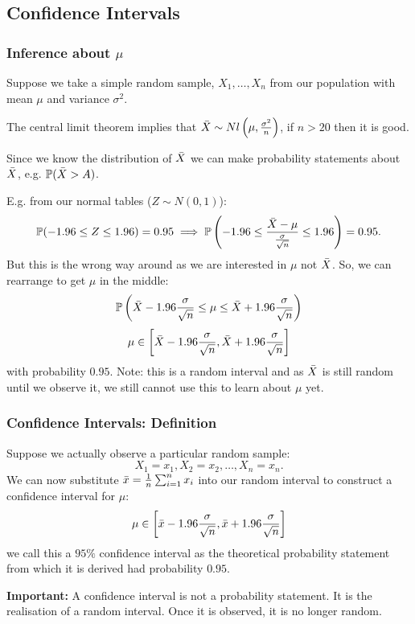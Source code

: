 \documentclass[10pt, a4paper]{article}
\begin{document}
\subsection{Confidence Intervals}
\subsubsection{Inference about \texorpdfstring{$\mu$}{}}

Suppose we take a simple random sample,
$X_1, \dotsc, X_n$ from our population with mean $\mu$ and variance $\sigma ^ 2$.

The central limit theorem implies that $\Bar{X} \sim Nl\left(\mu, \frac{\sigma ^ 2}{n}\right)$,
if $n > 20$ then it is good.

Since we know the distribution of $\Bar{X}$ we can make probability statements about $\Bar{X}$,
e.g. $\P(\Bar{X} > A)$.

E.g.
from our normal tables
($Z \sim N(0, 1)$):
\[
\P(-1.96 \leq Z \leq 1.96) = 0.95 \implies \P\left(-1.96 \leq \frac{\Bar{X} - \mu}{\frac{\sigma}{\sqrt{n}}} \leq 1.96\right) = 0.95.
\]
But this is the wrong way around as we are interested in $\mu$ not $\Bar{X}$.
So,
we can rearrange to get $\mu$ in the middle:
\[
\P\left(\Bar{X} - 1.96\frac{\sigma}{\sqrt{n}} \leq \mu \leq \Bar{X} + 1.96\frac{\sigma}{\sqrt{n}}\right)
\]
\[
\mu \in \left[\Bar{X} - 1.96\frac{\sigma}{\sqrt{n}}, \Bar{X} + 1.96\frac{\sigma}{\sqrt{n}}\right]
\]
with probability $0.95$.
Note:
this is a random interval and as $\Bar{X}$ is still random until we observe it,
we still cannot use this to learn about $\mu$ yet.

\subsubsection{Confidence Intervals:
Definition}
Suppose we actually observe a particular random sample:
\[
X_1 = x_1, X_2 = x_2, \dotsc, X_n = x_n.
\]
We can now substitute $\Bar{x} = \frac{1}{n}\sum_{i = 1}^{n}x_i$ into our random interval to construct a confidence interval for $\mu$:
\[
\mu \in \left[\Bar{x} - 1.96\frac{\sigma}{\sqrt{n}}, \Bar{x} + 1.96\frac{\sigma}{\sqrt{n}}\right]
\]
we call this a $95\%$ confidence interval as the theoretical probability statement from which it is derived had probability $0.95$.

\textbf{Important:}
A confidence interval is not a probability statement.
It is the realisation of a random interval.
Once it is observed,
it is no longer random.
\end{document}
